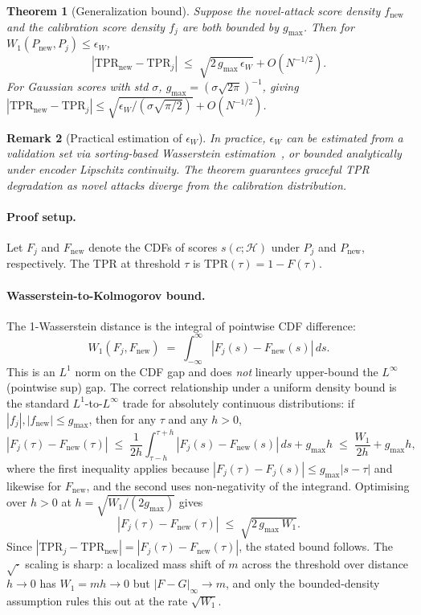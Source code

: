 \documentclass{article}
\newtheorem{theorem}{Theorem}
\newtheorem{remark}[theorem]{Remark}
\theoremstyle{definition}
\newcommand{\tpr}{\text{TPR}}
\newcommand{\cH}{\mathcal{H}}
\begin{document}
\begin{theorem}[Generalization bound]
\label{thm:generalization}
Suppose the novel-attack score density $f_{\text{new}}$ and the calibration score density $f_j$ are both bounded by $g_{\max}$. Then for $W_1(P_{\text{new}}, P_j) \leq \epsilon_W$,
\[
  |\tpr_{\text{new}} - \tpr_j| \;\leq\; \sqrt{2\,g_{\max}\,\epsilon_W} + O(N^{-1/2}).
\]
For Gaussian scores with std $\sigma$, $g_{\max} = (\sigma\sqrt{2\pi})^{-1}$, giving $|\tpr_{\text{new}} - \tpr_j| \leq \sqrt{\epsilon_W / (\sigma\sqrt{\pi/2})} + O(N^{-1/2})$.
\end{theorem}

\begin{remark}[Practical estimation of $\epsilon_W$]
\label{rem:epsilon_w}
In practice, $\epsilon_W$ can be estimated from a validation set via sorting-based Wasserstein estimation~\citep{villani2009optimal}, or bounded analytically under encoder Lipschitz continuity. The theorem guarantees graceful TPR degradation as novel attacks diverge from the calibration distribution.
\end{remark}

\paragraph{Proof setup.} Let $F_j$ and $F_{\text{new}}$ denote the CDFs of scores $s(c; \cH)$ under $P_j$ and $P_{\text{new}}$, respectively. The TPR at threshold $\tau$ is $\tpr(\tau) = 1 - F(\tau)$.

\paragraph{Wasserstein-to-Kolmogorov bound.} The 1-Wasserstein distance is the integral of pointwise CDF difference:
\begin{equation}
  W_1(F_j, F_{\text{new}}) \;=\; \int_{-\infty}^{\infty} |F_j(s) - F_{\text{new}}(s)| \, ds.
\end{equation}
This is an $L^1$ norm on the CDF gap and does \emph{not} linearly upper-bound the $L^\infty$ (pointwise sup) gap. The correct relationship under a uniform density bound is the standard $L^1$-to-$L^\infty$ trade for absolutely continuous distributions: if $|f_j|, |f_{\text{new}}| \leq g_{\max}$, then for any $\tau$ and any $h > 0$,
\[
  |F_j(\tau) - F_{\text{new}}(\tau)|
  \;\leq\;
  \frac{1}{2h}\!\int_{\tau-h}^{\tau+h}\! |F_j(s) - F_{\text{new}}(s)|\,ds + g_{\max} h
  \;\leq\;
  \frac{W_1}{2h} + g_{\max} h,
\]
where the first inequality applies because $|F_j(\tau) - F_j(s)| \leq g_{\max}|s-\tau|$ and likewise for $F_{\text{new}}$, and the second uses non-negativity of the integrand. Optimising over $h > 0$ at $h = \sqrt{W_1/(2g_{\max})}$ gives
\[
  |F_j(\tau) - F_{\text{new}}(\tau)| \;\leq\; \sqrt{2\,g_{\max}\,W_1}.
\]
Since $|\tpr_j - \tpr_{\text{new}}| = |F_j(\tau) - F_{\text{new}}(\tau)|$, the stated bound follows. The $\sqrt{\cdot}$ scaling is sharp: a localized mass shift of $m$ across the threshold over distance $h \to 0$ has $W_1 = m h \to 0$ but $|F-G|_\infty \to m$, and only the bounded-density assumption rules this out at the rate $\sqrt{W_1}$.
\end{document}

